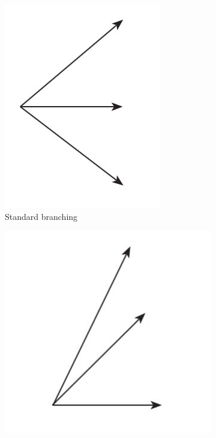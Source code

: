 \begin{figure}
\centering
\begin{subfigure}{.3\textwidth}
  \centering
  \includegraphics[width=.7\linewidth]{img/standardbranch.jpg}
  \caption{Standard branching}
  \label{fig:background:standardbranching}
\end{subfigure}
\begin{subfigure}{.3\textwidth}
  \centering
  \includegraphics[width=.93\linewidth]{img/bottombranch.jpg}

\end{subfigure}
\end{figure}
